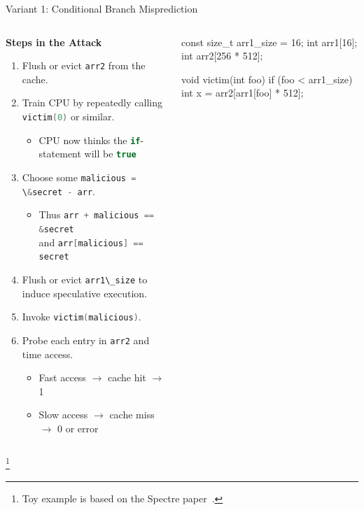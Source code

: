 \documentclass[10pt, dvipsnames, aspectratio=169]{beamer}
\newcommand\ufootnote[1]{%
    \begingroup
        \renewcommand\thefootnote{}\footnote{\hspace{-1.8em}#1}%
        \addtocounter{footnote}{-1}%
    \endgroup
}
\let\lsi\lstinline
\newcommand{\code}[1]{\lsi[language=c]|#1|}
\begin{document}
\begin{frame}[c, fragile]{Variant 1: Conditional Branch Misprediction}
  \begin{columns}
    \begin{column}[c]{0.6\textwidth}
      {\bf Steps in the Attack}
      \begin{enumerate}
        \item Flush or evict \code{arr2} from the cache.
        \item Train CPU by repeatedly calling \code{victim(0)} or similar.
        \begin{itemize}
          \item CPU now thinks the \code{if}-statement will be \code{true}
        \end{itemize}
        \item Choose some \code{malicious = \&secret - arr}.
        \begin{itemize}
          \item Thus \code{arr + malicious == &secret} \\
                and \code{arr[malicious] == secret}
        \end{itemize}
        \item Flush or evict \code{arr1\_size} to induce speculative execution.
        \item Invoke \code{victim(malicious)}.
        \item Probe each entry in \code{arr2} and time access.
        \begin{itemize}
          \item Fast access $\rightarrow$ cache hit $\rightarrow$ 1
          \item Slow access $\rightarrow$ cache miss $\rightarrow$ 0 or error
        \end{itemize}
      \end{enumerate}
    \end{column}

    \begin{column}[c]{0.4\textwidth}
      \begin{listing}[language=c,gobble=8,xleftmargin=1em]
        const size_t arr1_size = 16;
        int arr1[16];
        int arr2[256 * 512];

        void victim(int foo) {
            if (foo < arr1_size) {
                int x = arr2[arr1[foo] * 512];
            }
        }
      \end{listing}

    \end{column}
  \end{columns}
  \ufootnote{Toy example is based on the Spectre paper~\cite{kocher2019_spectre}.}
\end{frame}
\end{document}

